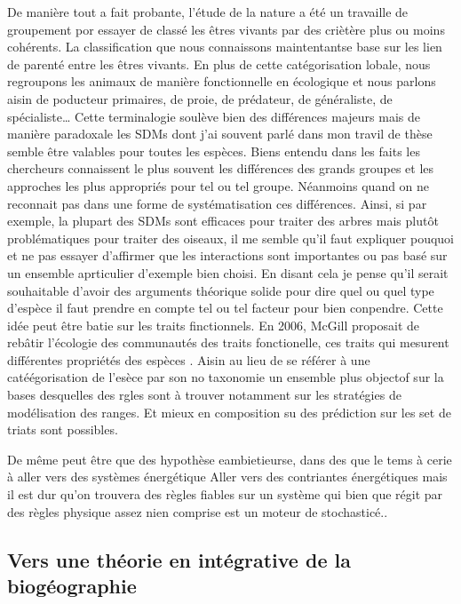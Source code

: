 De manière tout a fait probante, l'étude de la nature a été un travaille
de groupement por essayer de classé les êtres vivants par des criètère
plus ou moins cohérents. La classification que nous connaissons
maintentantse base sur les lien de parenté entre les êtres vivants. En
plus de cette catégorisation lobale, nous regroupons les animaux de
manière fonctionnelle en écologique et nous parlons aisin de poducteur
primaires, de proie, de prédateur, de généraliste, de
spécialiste\ldots{} Cette terminalogie soulève bien des différences
majeurs mais de manière paradoxale les SDMs dont j'ai souvent parlé dans
mon travil de thèse semble être valables pour toutes les espèces. Biens
entendu dans les faits les chercheurs connaissent le plus souvent les
différences des grands groupes et les approches les plus appropriés pour
tel ou tel groupe. Néanmoins quand on ne reconnait pas dans une forme de
systématisation ces différences. Ainsi, si par exemple, la plupart des
SDMs sont efficaces pour traiter des arbres mais plutôt problématiques
pour traiter des oiseaux, il me semble qu'il faut expliquer pouquoi et
ne pas essayer d'affirmer que les interactions sont importantes ou pas
basé sur un ensemble aprticulier d'exemple bien choisi. En disant cela
je pense qu'il serait souhaitable d'avoir des arguments théorique solide
pour dire quel ou quel type d'espèce il faut prendre en compte tel ou
tel facteur pour bien conpendre. Cette idée peut être batie sur les
traits finctionnels. En 2006, McGill proposait de rebâtir l'écologie des
communautés des traits fonctionelle, ces traits qui mesurent différentes
propriétés des espèces \citep{McGill2006}. Aisin au lieu de se référer à
une catéégorisation de l'esèce par son no taxonomie un ensemble plus
objectof sur la bases desquelles des rgles sont à trouver notamment sur
les stratégies de modélisation des ranges. Et mieux en composition su
des prédiction sur les set de triats sont possibles.

De même peut être que des hypothèse eambietieurse, dans des que le tems
à cerie à aller vers des systèmes énergétique Aller vers des contriantes
énergétiques mais il est dur qu'on trouvera des règles fiables sur un
système qui bien que régit par des règles physique assez nien comprise
est un moteur de stochasticé..

\subsection*{Vers une théorie en intégrative de la
biogéographie}\label{vers-une-thuxe9orie-en-intuxe9grative-de-la-bioguxe9ographie}

